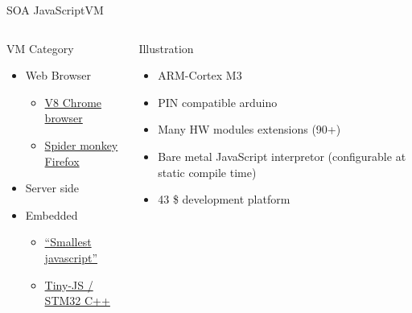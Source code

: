%
\begin{Frame}{SOA JavaScriptVM}
  \begin{columns}[t]
    \begin{column}{5cm} %
      \begin{block}{VM Category}
        \begin{itemize}
        \item Web Browser
          \begin{itemize}
          \item
            \href{https://en.wikipedia.org/wiki/V8_(JavaScript_engine)}{V8
              Chrome browser}
          \item
            \href{https://en.wikipedia.org/wiki/SpiderMonkey_(JavaScript_engine)}{Spider
              monkey Firefox}
          \end{itemize}
        \item Server side
        \item Embedded
          \begin{itemize}
          \item \href{https://github.com/cesanta/v7/}{``Smallest javascript''}
          \item \href{https://github.com/snoozbuster/tiny-js}{Tiny-JS
              / STM32 C++}
          \end{itemize}
        \end{itemize}
      \end{block} 
    \end{column}
    \begin{column}{5cm} %
      \begin{block}{Illustration}
        \begin{itemize}
        \item ARM-Cortex M3
        \item PIN compatible arduino
        \item Many HW modules extensions (90+)
        \item Bare metal JavaScript interpretor (configurable at
          static compile time)
        \item 43 \$ development platform
        \end{itemize}
      \end{block}   
    \end{column}
  \end{columns}  
\end{Frame}


